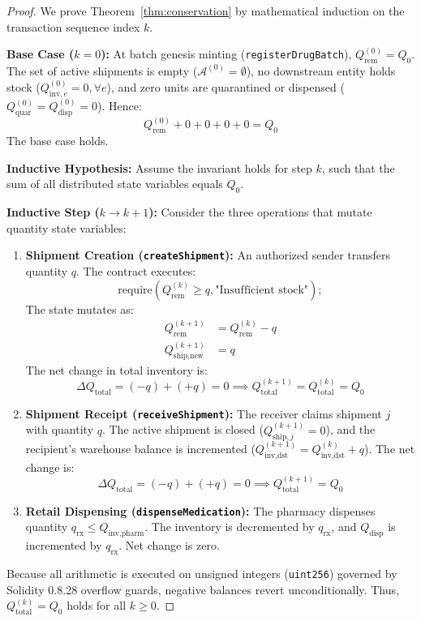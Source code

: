 \documentclass[pdflatex,sn-mathphys-num]{sn-jnl}
\theoremstyle{thmstyleone}
\theoremstyle{thmstyletwo}
\theoremstyle{thmstylethree}
\begin{document}
\begin{proof}
We prove Theorem~\ref{thm:conservation} by mathematical induction on the transaction sequence index $k$.

\textbf{Base Case ($k=0$):} At batch genesis minting (\texttt{registerDrugBatch}), $Q_{\text{rem}}^{(0)} = Q_0$. The set of active shipments is empty ($\mathcal{A}^{(0)} = \emptyset$), no downstream entity holds stock ($Q_{\text{inv}, e}^{(0)} = 0, \forall e$), and zero units are quarantined or dispensed ($Q_{\text{quar}}^{(0)} = Q_{\text{disp}}^{(0)} = 0$). Hence:
\begin{equation}
Q_{\text{rem}}^{(0)} + 0 + 0 + 0 + 0 = Q_0
\end{equation}
The base case holds.

\textbf{Inductive Hypothesis:} Assume the invariant holds for step $k$, such that the sum of all distributed state variables equals $Q_0$.

\textbf{Inductive Step ($k \to k+1$):} Consider the three operations that mutate quantity state variables:
\begin{enumerate}[label=(\alph*)]
    \item \textbf{Shipment Creation (\texttt{createShipment}):} An authorized sender transfers quantity $q$. The contract executes:
    \begin{equation}
    \text{require}(Q_{\text{rem}}^{(k)} \ge q, \text{"Insufficient stock"});
    \end{equation}
    The state mutates as:
    \begin{align}
    Q_{\text{rem}}^{(k+1)} &= Q_{\text{rem}}^{(k)} - q \\
    Q_{\text{ship}, \text{new}}^{(k+1)} &= q
    \end{align}
    The net change in total inventory is:
    \begin{equation}
    \Delta Q_{\text{total}} = (-q) + (+q) = 0 \implies Q_{\text{total}}^{(k+1)} = Q_{\text{total}}^{(k)} = Q_0
    \end{equation}
    \item \textbf{Shipment Receipt (\texttt{receiveShipment}):} The receiver claims shipment $j$ with quantity $q$. The active shipment is closed ($Q_{\text{ship}, j}^{(k+1)} = 0$), and the recipient's warehouse balance is incremented ($Q_{\text{inv}, \text{dst}}^{(k+1)} = Q_{\text{inv}, \text{dst}}^{(k)} + q$). The net change is:
    \begin{equation}
    \Delta Q_{\text{total}} = (-q) + (+q) = 0 \implies Q_{\text{total}}^{(k+1)} = Q_0
    \end{equation}
    \item \textbf{Retail Dispensing (\texttt{dispenseMedication}):} The pharmacy dispenses quantity $q_{\text{rx}} \le Q_{\text{inv}, \text{pharm}}$. The inventory is decremented by $q_{\text{rx}}$, and $Q_{\text{disp}}$ is incremented by $q_{\text{rx}}$. Net change is zero.
\end{enumerate}
Because all arithmetic is executed on unsigned integers (\texttt{uint256}) governed by Solidity 0.8.28 overflow guards, negative balances revert unconditionally. Thus, $Q_{\text{total}}^{(k)} = Q_0$ holds for all $k \ge 0$.
\end{proof}
\end{document}
